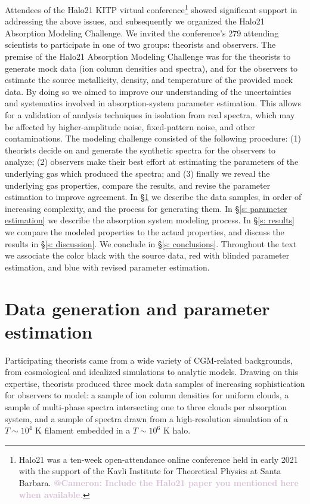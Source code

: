 \documentclass[fleqn,usenatbib]{mnras}
\makeatletter
\newcommand{\atcameron}[1]{\textcolor{Thistle}{\textbf{@Cameron: #1}}}
\makeatother
\begin{document}
Attendees of the Halo21 KITP virtual conference\footnote{Halo21 was a ten-week open-attendance online conference held in early 2021 with the support of the Kavli Institute for Theoretical Physics at Santa Barbara. \atcameron{Include the Halo21 paper you mentioned here when available.}}
showed significant support in addressing the above issues, and subsequently we organized the Halo21 Absorption Modeling Challenge.
We invited the conference's 279 attending scientists to participate in one of two groups:
theorists and observers.
The premise of the Halo21 Absorption Modeling Challenge was for the theorists to generate mock data (ion column densities and spectra), and for the observers to estimate the source metallicity, density, and temperature of the provided mock data.
By doing so we aimed to improve our understanding of the uncertainties and systematics involved in absorption-system parameter estimation.
This allows for a validation of analysis techniques in isolation from real spectra,
which may be affected by higher-amplitude noise, fixed-pattern noise, and other contaminations.
The modeling challenge consisted of the following procedure:
(1) theorists decide on and generate the synthetic spectra for the observers to analyze; (2) observers make their best effort at estimating the parameters of the underlying gas which produced the spectra; and (3) finally we reveal the underlying gas properties, compare the results, and revise the parameter estimation to improve agreement.
In \S\ref{s: data generation} we describe the data samples, in order of increasing complexity, and the process for generating them.
In \S\ref{s:  parameter estimation} we describe the absorption system modeling process.
In \S\ref{s: results} we compare the modeled properties to the actual properties, and discuss the results in \S\ref{s: discussion}.
We conclude in \S\ref{s: conclusions}.
Throughout the text we associate the color black with the source data,
red with blinded parameter estimation,
and blue with revised parameter estimation.

\section{Data generation and parameter estimation}
\label{s: data generation}

Participating theorists came from a wide variety of CGM-related backgrounds, from cosmological and idealized simulations to analytic models.
Drawing on this expertise, theorists produced three mock data samples of increasing sophistication for observers to model:
a sample of ion column densities for uniform clouds,
a sample of multi-phase spectra intersecting one to three clouds per absorption system,
and a sample of spectra drawn from a high-resolution simulation of a $T \sim 10^4$ K filament embedded in a $T \sim 10^6$ K halo.
\end{document}
